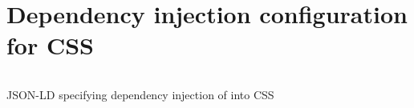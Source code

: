 \section{Dependency injection configuration for CSS}
\label{appendix:css-config}

\begin{code}
\inputminted[linenos,tabsize=2,breaklines]{json}{code/css-config.json}
\caption{JSON-LD specifying dependency injection of \middleware{} into \acrshort{CSS}}
\label{listing:css-config}
\end{code}